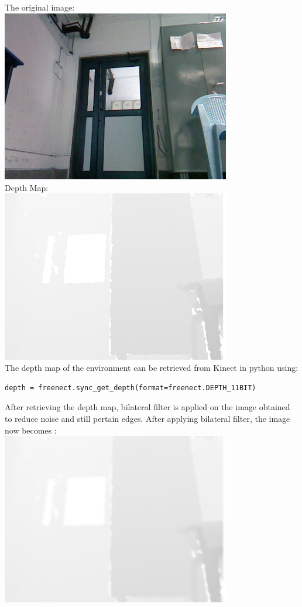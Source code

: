 \documentclass{report}
\begin{document}
The original image: \\
\includegraphics[width = 10cm]{reference.jpg} \\
Depth Map:\\
\includegraphics[width = 10cm]{feed.jpg} \\
The depth map of the environment can be retrieved from Kinect in python using: \\
\begin{lstlisting}
depth = freenect.sync_get_depth(format=freenect.DEPTH_11BIT)
\end{lstlisting}
After retrieving the depth map, bilateral filter is applied on the image obtained to reduce noise and still pertain edges. After
applying bilateral filter, the image now becomes : \\
\includegraphics[width = 10cm]{bilat.jpg}
\end{document}
